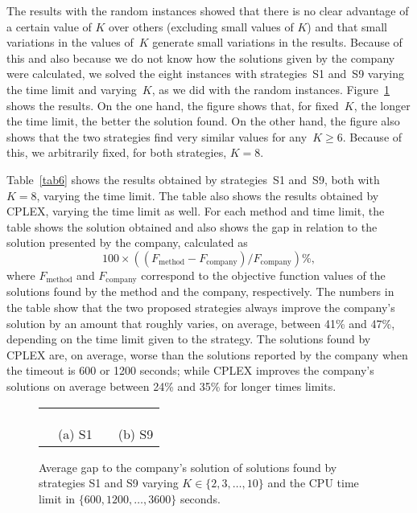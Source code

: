\documentclass[11pt]{article}
\begin{document}
The results with the random instances showed that there is no clear advantage of a certain value of $K$ over others (excluding small values of $K$) and that small variations in the values of~$K$ generate small variations in the results. Because of this and also because we do not know how the solutions given by the company were calculated, we solved the eight instances with strategies~S1 and~S9 varying the time limit and varying~$K$, as we did with the random instances. Figure~\ref{fig7} shows the results. On the one hand, the figure shows that, for fixed~$K$, the longer the time limit, the better the solution found. On the other hand, the figure also shows that the two strategies find very similar values for any~$K \geq 6$. Because of this, we arbitrarily fixed, for both strategies, $K=8$.

Table~\ref{tab6} shows the results obtained by strategies~S1 and~S9, both with $K=8$, varying the time limit. The table also shows the results obtained by CPLEX, varying the time limit as well. For each method and time limit, the table shows the solution obtained and also shows the gap in relation to the solution presented by the company, calculated as
\[
100 \times \left( ( F_{\mathrm{method}} - F_{\mathrm{company}} ) / F_{\mathrm{company}} \right) \%,
\]
where $F_{\mathrm{method}}$ and $F_{\mathrm{company}}$ correspond to the objective function values of the solutions found by the method and the company, respectively. The numbers in the table show that the two proposed strategies always improve the company's solution by an amount that roughly varies, on average, between 41\% and 47\%, depending on the time limit given to the strategy. The solutions found by CPLEX are, on average, worse than the solutions reported by the company when the timeout is 600 or 1200 seconds; while CPLEX improves the company's solutions on average between 24\% and 35\% for longer times limits.

\begin{figure}
\centering
\begin{tabular}{cccc}
\hspace{1cm} &  & & \\
\\
\\
& (a) S1 & & (b) S9
\end{tabular}
\caption{Average gap to the company's solution of solutions found by strategies S1 and S9 varying $K \in \{2, 3, \dots, 10 \}$ and the CPU time limit in $\{600, 1200, \dots, 3600\}$ seconds.}
\label{fig7}
\end{figure}
\end{document}

